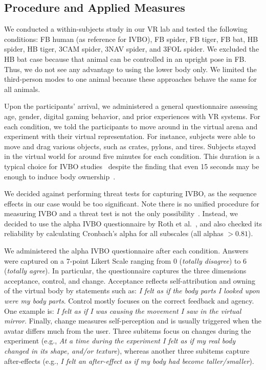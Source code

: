 \documentclass[conference]{IEEEtran}
\begin{document}
\subsection{Procedure and Applied Measures}


We conducted a within-subjects study in our VR lab and tested the following conditions: FB human (as reference for IVBO), FB spider, FB tiger, FB bat, HB spider, HB tiger, 3CAM spider, 3NAV spider, and 3FOL spider. We excluded the HB bat case because that animal can be controlled in an upright pose in FB. Thus, we do not see any advantage to using the lower body only. We limited the third-person modes to one animal because these approaches behave the same for all animals.




Upon the participants' arrival, we administered a general questionnaire assessing age, gender, digital gaming behavior, and prior experiences with VR systems. For each condition, we told the participants to move around in the virtual arena and experiment with their virtual representation. For instance, subjects were able to move and drag various objects, such as crates, pylons, and tires. Subjects stayed in the virtual world for around five minutes for each condition. This duration is a typical choice for IVBO studies~\cite{tsakiris2005rubber} despite the finding that even 15 seconds may be enough to induce body ownership~\cite{lloyd2007spatial}. 

We decided against performing threat tests for capturing IVBO, as the sequence effects in our case would be too significant. Note there is no unified procedure for measuring IVBO and a threat test is not the only possibility~\cite{kilteni2012sense,roth2017alpha}. Instead, we decided to use the alpha IVBO questionnaire by Roth et al.~\cite{roth2017alpha}, and also checked its reliability by calculating Cronbach’s alpha for all subscales (all alphas $> 0.81$).






We administered the alpha IVBO questionnaire after each condition. Answers were captured on a 7-point Likert Scale ranging from 0 (\textit{totally disagree}) to 6 (\textit{totally agree}). In particular, the questionnaire captures the three dimensions acceptance, control, and change. Acceptance reflects self-attribution and owning of the virtual body by statements such as: \textit{I felt as if the body parts I looked upon were my body parts}. Control mostly focuses on the correct feedback and agency. One example is: \textit{I felt as if I was causing the movement I saw in the virtual mirror}. Finally, change measures self-perception and is usually triggered when the avatar differs much from the user. Three subitems focus on changes during the experiment (e.g., \textit{At a time during the experiment I felt as if my real body changed in its shape, and/or texture}), whereas another three subitems capture after-effects (e.g., \textit{I felt an after-effect as if my body had become taller/smaller}).
\end{document}
